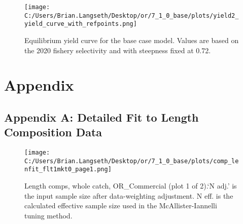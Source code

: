\documentclass[11pt,
  english,
  a4paper,
]{article}
\begin{document}
\tagmcend\tagstructend


\begin{figure}
\centering
\texttt{[image: C:/Users/Brian.Langseth/Desktop/or/7\_1\_0\_base/plots/yield2\_yield\_curve\_with\_refpoints.png]}
\caption{Equilibrium yield curve for the base case model. Values are based on the 2020 fishery selectivity and with steepness fixed at 0.72.\label{fig:yield}}
\end{figure}

\tagmcend\tagstructend

\newpage

\clearpage


\hypertarget{appendix}{%
\section{Appendix}\label{appendix}}

\leavevmode\tagmcend\tagstructend


\hypertarget{appendix-a-detailed-fit-to-length-composition-data}{%
\subsection{Appendix A: Detailed Fit to Length Composition Data}\label{appendix-a-detailed-fit-to-length-composition-data}}

\leavevmode\tagmcend\tagstructend


\begin{figure}
\centering
\texttt{[image: C:/Users/Brian.Langseth/Desktop/or/7\_1\_0\_base/plots/comp\_lenfit\_flt1mkt0\_page1.png]}
\caption{Length comps, whole catch, OR\_Commercial (plot 1 of 2).`N adj.' is the input sample size after data-weighting adjustment. N eff. is the calculated effective sample size used in the McAllister-Iannelli tuning method.\label{fig:comp_lenfit_flt1mkt0_page1}}
\end{figure}
\end{document}

